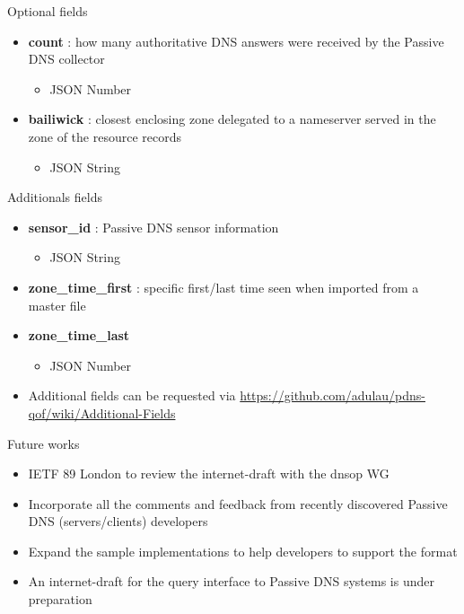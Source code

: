\begin{frame}[t]{Optional fields}
\begin{itemize}
\item \textbf{count} : how many authoritative DNS answers were received by the Passive DNS collector
\begin{itemize}
\item JSON Number
\end{itemize}
\item \textbf{bailiwick} : closest enclosing zone delegated to a nameserver served in the zone of the resource records
\begin{itemize}
\item JSON String
\end{itemize}

\end{itemize}
\end{frame}

\begin{frame}[t]{Additionals fields}
\begin{itemize}
\item \textbf{sensor\_id} : Passive DNS sensor information
\begin{itemize}
\item JSON String
\end{itemize}
\item \textbf{zone\_time\_first} : specific first/last time seen when imported from a master file
\item \textbf{zone\_time\_last}
\begin{itemize}
\item JSON Number
\end{itemize}
\item Additional fields can be requested via \url{https://github.com/adulau/pdns-qof/wiki/Additional-Fields}
\end{itemize}
\end{frame}


\begin{frame}[t]{Future works}
\begin{itemize}
\item IETF 89 London to review the internet-draft with the dnsop WG
\item Incorporate all the comments and feedback from recently discovered Passive DNS (servers/clients) developers
\item Expand the sample implementations to help developers to support the format
\item An internet-draft for the query interface to Passive DNS systems is under preparation
\end{itemize}
\end{frame}

